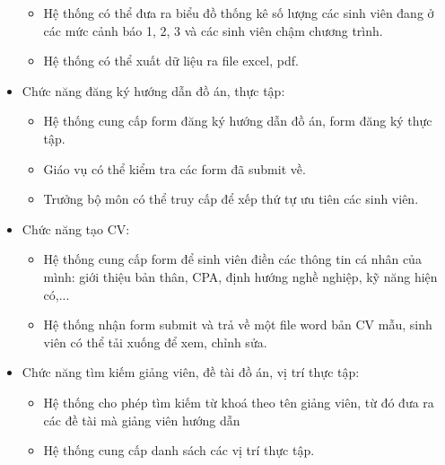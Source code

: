 \begin{itemize}
	      \begin{itemize}
		      \item Hệ thống có thể đưa ra biểu đồ thống kê số lượng các sinh viên đang ở các mức cảnh báo 1, 2, 3 và các sinh viên chậm chương trình.
		      \item Hệ thống có thể xuất dữ liệu ra file excel, pdf.
	      \end{itemize}
	\item Chức năng đăng ký hướng dẫn đồ án, thực tập:
	      \begin{itemize}
		      \item Hệ thống cung cấp form đăng ký hướng dẫn đồ án, form đăng ký thực tập.
		      \item Giáo vụ có thể kiểm tra các form đã submit về.
		      \item Trưởng bộ môn có thể truy cấp để xếp thứ tự ưu tiên các sinh viên.
	      \end{itemize}
	\item Chức năng tạo CV:
	      \begin{itemize}
		      \item Hệ thống cung cấp form để sinh viên điền các thông tin cá nhân của mình: giới thiệu bản thân, CPA, định hướng nghề nghiệp, kỹ năng hiện có,...
		      \item Hệ thống nhận form submit và trả về một file word bản CV mẫu, sinh viên có thể tải xuống để xem, chỉnh sửa.
	      \end{itemize}
	\item Chức năng tìm kiếm giảng viên, đề tài đồ án, vị trí thực tập:
	      \begin{itemize}
		      \item Hệ thống cho phép tìm kiếm từ khoá theo tên giảng viên, từ đó đưa ra các đề tài mà giảng viên hướng dẫn
		      \item Hệ thống cung cấp danh sách các vị trí thực tập.
	      \end{itemize}
\end{itemize}